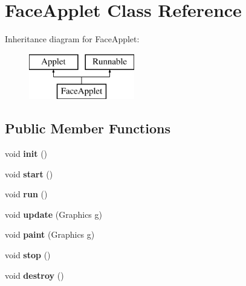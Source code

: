 \hypertarget{class_face_applet}{}\section{Face\+Applet Class Reference}
\label{class_face_applet}
Inheritance diagram for Face\+Applet\+:\begin{figure}[H]
\begin{center}
\leavevmode
\includegraphics[height=2.000000cm]{class_face_applet}
\end{center}
\end{figure}
\subsection*{Public Member Functions}
\begin{DoxyCompactItemize}
\item 
\hypertarget{class_face_applet_a525d14d31dacf13a4a2306bdda35d0fa}{}void {\bfseries init} ()\label{class_face_applet_a525d14d31dacf13a4a2306bdda35d0fa}

\item 
\hypertarget{class_face_applet_a807e3855e58d0f4f225b0a4dcb0ee609}{}void {\bfseries start} ()\label{class_face_applet_a807e3855e58d0f4f225b0a4dcb0ee609}

\item 
\hypertarget{class_face_applet_aec2a611e9c95ddcae711048019b873e6}{}void {\bfseries run} ()\label{class_face_applet_aec2a611e9c95ddcae711048019b873e6}

\item 
\hypertarget{class_face_applet_a29eab6be3c2a20904e5ecd164b4b45b7}{}void {\bfseries update} (Graphics g)\label{class_face_applet_a29eab6be3c2a20904e5ecd164b4b45b7}

\item 
\hypertarget{class_face_applet_a39907dfdd58523ce617c644bbcb98cb2}{}void {\bfseries paint} (Graphics g)\label{class_face_applet_a39907dfdd58523ce617c644bbcb98cb2}

\item 
\hypertarget{class_face_applet_aa1c6c09fe9ad068e962956fbca7a256a}{}void {\bfseries stop} ()\label{class_face_applet_aa1c6c09fe9ad068e962956fbca7a256a}

\item 
\hypertarget{class_face_applet_a941e15344b6ae78456ee1d7c459bd081}{}void {\bfseries destroy} ()\label{class_face_applet_a941e15344b6ae78456ee1d7c459bd081}

\end{DoxyCompactItemize}


